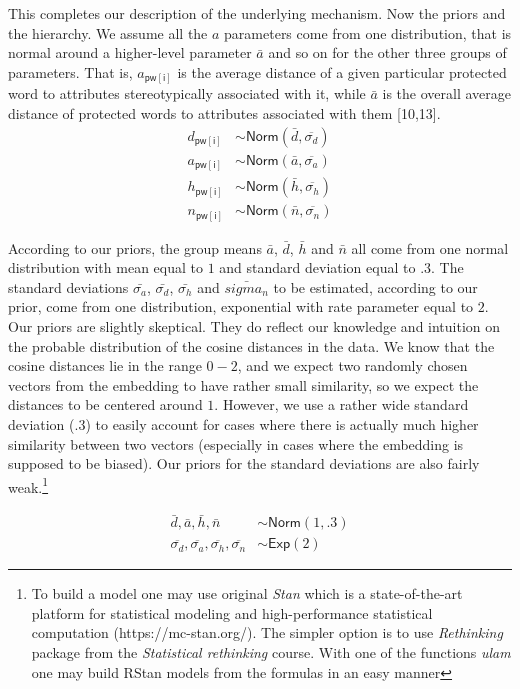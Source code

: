 \documentclass[
  10pt,
  dvipsnames,enabledeprecatedfontcommands]{scrartcl}
\begin{document}
This completes our description of the underlying mechanism. Now the
priors and the hierarchy. We assume all the \(a\) parameters come from
one distribution, that is normal around a higher-level parameter
\(\bar{a}\) and so on for the other three groups of parameters. That is,
\(a_{\mathsf{pw[i]}}\) is the average distance of a given particular
protected word to attributes stereotypically associated with it, while
\(\bar{a}\) is the overall average distance of protected words to
attributes associated with them {[}10,13{]}. \begin{align*}
d_{\mathsf{pw[i]}} &\sim \mathsf{Norm}(\bar{d}, \overline{\sigma_d}) \\
a_{\mathsf{pw[i]}} &\sim \mathsf{Norm}(\bar{a}, \overline{\sigma_a}) \\
h_{\mathsf{pw[i]}} &\sim \mathsf{Norm}(\bar{h}, \overline{\sigma_h}) \\
n_{\mathsf{pw[i]}} &\sim \mathsf{Norm}(\bar{n}, \overline{\sigma_n}) 
\end{align*}

According to our priors, the group means \(\bar{a}\), \(\bar{d}\),
\(\bar{h}\) and \(\bar{n}\) all come from one normal distribution with
mean equal to \(1\) and standard deviation equal to \(.3\). The standard
deviations \(\bar{\sigma_a}\), \(\bar{\sigma_d}\), \(\bar{\sigma_h}\)
and \(\bar{sigma_n}\) to be estimated, according to our prior, come from
one distribution, exponential with rate parameter equal to \(2\). Our
priors are slightly skeptical. They do reflect our knowledge and
intuition on the probable distribution of the cosine distances in the
data. We know that the cosine distances lie in the range \(0-2\), and we
expect two randomly chosen vectors from the embedding to have rather
small similarity, so we expect the distances to be centered around
\(1\). However, we use a rather wide standard deviation (\(.3\)) to
easily account for cases where there is actually much higher similarity
between two vectors (especially in cases where the embedding is supposed
to be biased). Our priors for the standard deviations are also fairly
weak.\footnote{To build a model one may use original \textit{Stan} which is a state-of-the-art platform for statistical modeling and high-performance statistical computation (https://mc-stan.org/). The simpler option is to use \textit{Rethinking} package from the \textit{Statistical rethinking} course. With one of the functions \textit{ulam} one may build RStan models from the formulas in an easy manner}

\begin{align*}
\bar{d}, \bar{a}, \bar{h}, \bar{n} &\sim \mathsf{Norm}(1, .3)\\ 
\overline{\sigma_d}, \overline{\sigma_a},  \overline{\sigma_h},  \overline{\sigma_n}  &\sim \mathsf{Exp}(2)
\end{align*}
\end{document}
